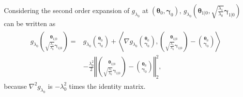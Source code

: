 Considering the second order expansion of $g_{\lambda_0}$ at $(\boldsymbol\theta_{0},\boldsymbol\gamma_{0})$, $g_{\lambda_0}\left(\boldsymbol\theta_{1|0},\sqrt{\frac{\lambda_1}{\lambda_0}}\boldsymbol\gamma_{1|0}\right)$ can be written as
\begin{gather}
    \label{eq:1.1.1}
    \begin{aligned}
        g_{\lambda_0}\binom{\boldsymbol\theta_{1|0}}{\sqrt{\frac{\lambda_1}{\lambda_0}}\boldsymbol\gamma_{1|0}}=&g_{\lambda_0}\binom{\boldsymbol\theta_{0}}{\boldsymbol\gamma_{0}}+\left\langle\nabla g_{\lambda_0}\binom{\boldsymbol\theta_{0}}{\boldsymbol\gamma_{0}},\binom{\boldsymbol\theta_{1|0}}{\sqrt{\frac{\lambda_1}{\lambda_0}}\boldsymbol\gamma_{1|0}}-\binom{\boldsymbol\theta_{0}}{\boldsymbol\gamma_{0}}\right\rangle\\
        &-\frac{\lambda_0^2}{2}\left\Vert\binom{\boldsymbol\theta_{1|0}}{\sqrt{\frac{\lambda_1}{\lambda_0}}\boldsymbol\gamma_{1|0}}-\binom{\boldsymbol\theta_{0}}{\boldsymbol\gamma_{0}}\right\Vert_2^2,
    \end{aligned}
\end{gather}
because $\nabla^2g_{\lambda_0}$ is $-\lambda_0^2$ times the identity matrix. 


